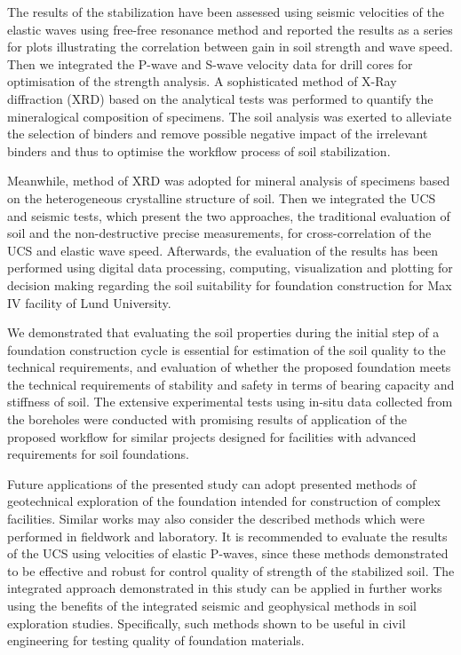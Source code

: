 \documentclass[USenglish,twocolumn]{article}
\begin{document}
The results of the stabilization have been assessed using seismic velocities of the elastic waves using free-free resonance method and reported the results as a series for plots illustrating the correlation between gain in soil strength and wave speed. Then we integrated the P-wave and S-wave velocity data for drill cores for optimisation of the strength analysis. A sophisticated method of X-Ray diffraction (XRD) based on the analytical tests was performed to quantify the mineralogical composition of specimens. The soil analysis was exerted to alleviate the selection of binders and remove possible negative impact of the irrelevant binders and thus to optimise the workflow process of soil stabilization.

Meanwhile, method of XRD was adopted for mineral analysis of specimens based on the heterogeneous crystalline structure of soil. Then we integrated the UCS and seismic tests, which present the two approaches, the traditional evaluation of soil and the non-destructive precise measurements, for cross-correlation of the UCS and elastic wave speed. Afterwards, the evaluation of the results has been performed using digital data processing, computing, visualization and plotting for decision making regarding the soil suitability for foundation construction for Max IV facility of Lund University. 

We demonstrated that evaluating the soil properties during the initial step of a foundation construction cycle is essential for estimation of the soil quality to the technical requirements, and evaluation of whether the proposed foundation meets the technical requirements of stability and safety in terms of bearing capacity and stiffness of soil. The extensive experimental tests using in-situ data collected from the boreholes were conducted with promising results of application of the proposed workflow for similar projects designed for facilities with advanced requirements for soil foundations. 

Future applications of the presented study can adopt presented methods of geotechnical exploration of the foundation intended for construction of complex facilities. Similar works may also consider the described methods which were performed in fieldwork and laboratory. It is recommended to evaluate the results of the UCS using velocities of elastic P-waves, since these methods demonstrated to be effective and robust for control quality of strength of the stabilized soil. The integrated approach demonstrated in this study can be applied in further works using the benefits of the integrated seismic and geophysical methods in soil exploration studies. Specifically, such methods shown to be useful in civil engineering for testing quality of foundation materials.
\end{document}
